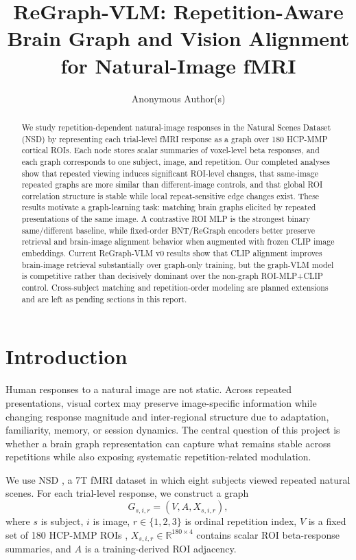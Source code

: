 \documentclass{article}
\title{ReGraph-VLM: Repetition-Aware Brain Graph and Vision Alignment for Natural-Image fMRI}
\author{%
  Anonymous Author(s)
}
\begin{document}
\maketitle

\begin{abstract}
We study repetition-dependent natural-image responses in the Natural Scenes Dataset (NSD) by representing each trial-level fMRI response as a graph over 180 HCP-MMP cortical ROIs. Each node stores scalar summaries of voxel-level beta responses, and each graph corresponds to one subject, image, and repetition. Our completed analyses show that repeated viewing induces significant ROI-level changes, that same-image repeated graphs are more similar than different-image controls, and that global ROI correlation structure is stable while local repeat-sensitive edge changes exist. These results motivate a graph-learning task: matching brain graphs elicited by repeated presentations of the same image. A contrastive ROI MLP is the strongest binary same/different baseline, while fixed-order BNT/ReGraph encoders better preserve retrieval and brain-image alignment behavior when augmented with frozen CLIP image embeddings. Current ReGraph-VLM v0 results show that CLIP alignment improves brain-image retrieval substantially over graph-only training, but the graph-VLM model is competitive rather than decisively dominant over the non-graph ROI-MLP+CLIP control. Cross-subject matching and repetition-order modeling are planned extensions and are left as pending sections in this report.
\end{abstract}

\section{Introduction}

Human responses to a natural image are not static. Across repeated presentations, visual cortex may preserve image-specific information while changing response magnitude and inter-regional structure due to adaptation, familiarity, memory, or session dynamics. The central question of this project is whether a brain graph representation can capture what remains stable across repetitions while also exposing systematic repetition-related modulation.

We use NSD \citep{allen2022nsd}, a 7T fMRI dataset in which eight subjects viewed repeated natural scenes. For each trial-level response, we construct a graph
\begin{equation}
  G_{s,i,r} = (V, A, X_{s,i,r}),
\end{equation}
where $s$ is subject, $i$ is image, $r \in \{1,2,3\}$ is ordinal repetition index, $V$ is a fixed set of 180 HCP-MMP ROIs \citep{glasser2016mmp}, $X_{s,i,r}\in\mathbb{R}^{180\times4}$ contains scalar ROI beta-response summaries, and $A$ is a training-derived ROI adjacency.
\end{document}
